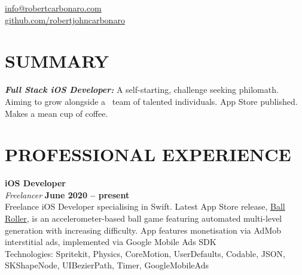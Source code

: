 \documentclass[margin,line]{resume}
\begin{document}
{
    \hfill \href{mailto:info@robertcarbonaro.com}{info@robertcarbonaro.com}\vspace{0mm}\\\vspace{0mm}%
    \hfill \href{https://github.com/robertjohncarbonaro}{github.com/robertjohncarbonaro}\vspace{0mm}\\\vspace{0mm}%
    
}

\begin{resume}

    \vspace{-3mm}

    \section{\mysidestyle \textbf{\large{S}\small{UMMARY}}}
     \textbf{\textsl{Full Stack iOS Developer:}} A self-starting, challenge seeking philomath. Aiming to grow alongside a  team of talented individuals. App Store published. Makes a mean cup of coffee.    
    \vspace{-1mm}
\sectionline

    \section{\mysidestyle \textbf{\large{P}\small{ROFESSIONAL} \large{E}\small{XPERIENCE}}}

    \textbf{\listing iOS Developer} \vspace{2mm}\\\vspace{1mm}%
    \textsl{Freelancer} \hfill \textbf{June 2020 -- present}\\
  Freelance iOS Developer specialising in Swift. Latest App Store release, \href{https://apps.apple.com/gb/app/ball-roller/id1535798808}{Ball Roller}, is an accelerometer-based ball game featuring automated multi-level generation with increasing difficulty. App features monetisation via AdMob interstitial ads, implemented via Google Mobile Ads SDK\\
  Technologies: Spritekit, Physics, CoreMotion, UserDefaults, Codable, JSON, SKShapeNode, UIBezierPath, Timer, GoogleMobileAds
    

\end{resume}
\end{document}
